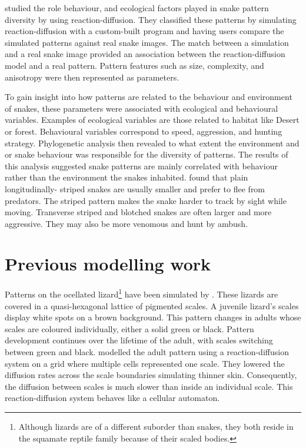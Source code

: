 \citet{allen2013} studied the role behaviour, and ecological factors played in snake pattern diversity by using reaction-diffusion. They classified these patterns by simulating reaction-diffusion with a custom-built program and having users compare the simulated patterns against real snake images. The match between a simulation and a real snake image provided an association between the reaction-diffusion model and a real pattern. Pattern features such as size, complexity, and anisotropy were then represented as parameters.

To gain insight into how patterns are related to the behaviour and environment of snakes, these parameters were associated with ecological and behavioural variables. Examples of ecological variables are those related to habitat like Desert or forest. Behavioural variables correspond to speed, aggression, and hunting strategy. Phylogenetic analysis then revealed to what extent the environment and or snake behaviour was responsible for the diversity of patterns. The results of this analysis suggested snake patterns are mainly correlated with behaviour rather than the environment the snakes inhabited. \citet{allen2013} found that plain longitudinally- striped snakes are usually smaller and prefer to flee from predators. The striped pattern makes the snake harder to track by sight while moving. Transverse striped and blotched snakes are often larger and more aggressive. They may also be more venomous and hunt by ambush.

\section{Previous modelling work}
Patterns on the ocellated lizard\footnote{Although lizards are of a different suborder than snakes, they both reside in the squamate reptile family because of their scaled bodies.} have been simulated by \citet{manukyan2017}. These lizards are covered in a quasi-hexagonal lattice of pigmented scales. A juvenile lizard's scales display white spots on a brown background. This pattern changes in adults whose scales are coloured individually, either a solid green or black. Pattern development continues over the lifetime of the adult, with scales switching between green and black. \citet{manukyan2017} modelled the adult pattern using a reaction-diffusion system on a grid where multiple cells represented one scale. They lowered the diffusion rates across the scale boundaries simulating thinner skin. Consequently, the diffusion between scales is much slower than inside an individual scale. This reaction-diffusion system behaves like a cellular automaton.

